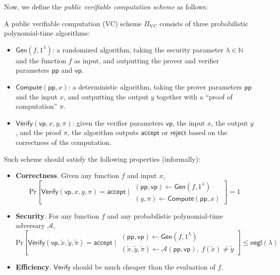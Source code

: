 \documentclass{iacrtrans}
\begin{document}
Now, we define the \textit{public verifiable computation scheme} as follows:
\begin{definition}
  A public verifiable computation (VC) scheme $\Pi_{\text{VC}}$ consists of three probabilistic polynomial-time algorithms:
  \begin{itemize}
    \item $\mathsf{Gen}(f,1^{\lambda})$: a randomized algorithm, taking the
    security parameter $\lambda \in \mathbb{N}$ and the function $f$ as input,
    and outputting the prover and verifier parameters $\mathsf{pp}$ and
    $\mathsf{vp}$.
    \item $\mathsf{Compute}(\mathsf{pp}, x)$: a deterministic algorithm, taking
    the prover parameters $\mathsf{pp}$ and the input $x$, and outputting the
    output $y$ together with a ``proof of computation'' $\pi$.
    \item $\mathsf{Verify}(\mathsf{vp}, x, y, \pi)$: given the verifier
    parameters $\mathsf{vp}$, the input $x$, the output $y$, and the proof
    $\pi$, the algorithm outputs $\mathsf{accept}$ or $\mathsf{reject}$ based on
    the correctness of the computation.
  \end{itemize}

  Such scheme should satisfy the following properties (informally):
  \begin{itemize}
    \item \textbf{Correctness}. Given any function $f$ and input $x$,
    \begin{equation*}
      \text{Pr}\left[\mathsf{Verify}(\mathsf{vp}, x, y, \pi) = \mathsf{accept}\; \Big| \; \begin{matrix}
        (\mathsf{pp},\mathsf{vp}) \gets \mathsf{Gen}(f,1^{\lambda}) \\
        (y,\pi) \gets \mathsf{Compute}(\mathsf{pp},x)
      \end{matrix}\right] = 1
    \end{equation*}
    \item \textbf{Security}. For any function $f$ and any probabilistic
    polynomial-time adversary $\mathcal{A}$, 
    \begin{equation*}
      \text{Pr}\left[\mathsf{Verify}(\mathsf{vp}, \widetilde{x}, \widetilde{y}, \widetilde{\pi}) = \mathsf{accept}\; \Big| \; \begin{matrix}
        (\mathsf{pp},\mathsf{vp}) \gets \mathsf{Gen}(f,1^{\lambda}) \\
        (\widetilde{x}, \widetilde{y}, \widetilde{\pi}) \gets \mathcal{A}(\mathsf{pp}, \mathsf{vp}), \; f(\widetilde{x}) \neq \widetilde{y}
      \end{matrix}\right] \leq \mathsf{negl}(\lambda)
    \end{equation*}
    \item \textbf{Efficiency}. $\mathsf{Verify}$ should be much cheaper than the
    evaluation of $f$.
  \end{itemize}
\end{definition}
\end{document}
